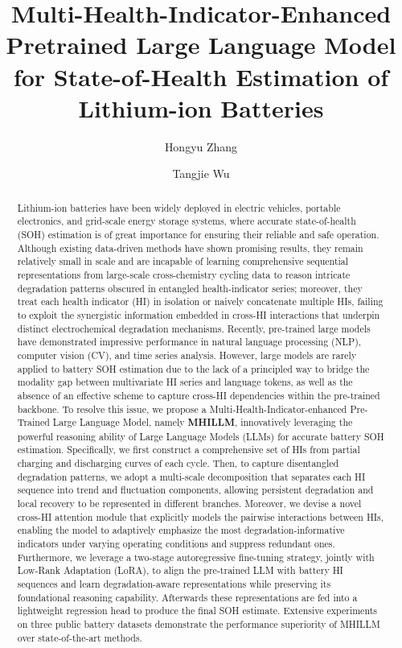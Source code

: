 \documentclass[preprint,12pt]{elsarticle}
\begin{document}
\begin{frontmatter}


\title{Multi-Health-Indicator-Enhanced Pretrained Large Language Model for State-of-Health Estimation of Lithium-ion Batteries}


\author{Hongyu Zhang}
\address[hfut]{Hefei University of Technology, Hefei, 230027, China}
\author{Tangjie Wu}
\address[ustc]{University of Science and Technology of China, Hefei, 230027, China}


\begin{abstract}
Lithium-ion batteries have been widely deployed in electric vehicles, portable electronics, and grid-scale energy storage systems, where accurate state-of-health (SOH) estimation is of great importance for ensuring their reliable and safe operation. Although existing data-driven methods have shown promising results, they remain relatively small in scale and are incapable of learning comprehensive sequential representations from large-scale cross-chemistry cycling data to reason intricate degradation patterns obscured in entangled health-indicator series; moreover, they treat each health indicator (HI) in isolation or naively concatenate multiple HIs, failing to exploit the synergistic information embedded in cross-HI interactions that underpin distinct electrochemical degradation mechanisms. Recently, pre-trained large models have demonstrated impressive performance in natural language processing (NLP), computer vision (CV), and time series analysis. However, large models are rarely
  applied to battery SOH estimation due to the lack of a principled way to bridge the modality gap between multivariate HI series and language tokens, as well as the absence of an effective scheme to capture cross-HI dependencies within the pre-trained backbone. To resolve this issue, we propose a Multi-Health-Indicator-enhanced Pre-Trained Large Language Model, namely \textbf{MHILLM}, innovatively leveraging the powerful reasoning ability of Large Language Models (LLMs) for accurate battery SOH estimation. Specifically, we first construct a comprehensive set of HIs from partial charging and discharging curves of each cycle. Then, to capture disentangled degradation patterns, we adopt a multi-scale decomposition that separates each HI sequence into trend and fluctuation components, allowing persistent degradation and local recovery to be represented in different branches. Moreover, we devise a novel cross-HI attention module that explicitly models the pairwise interactions between HIs, enabling the model to adaptively emphasize the most degradation-informative indicators under varying operating conditions and suppress redundant ones.
Furthermore, we leverage a two-stage autoregressive fine-tuning strategy, jointly with Low-Rank Adaptation (LoRA), to align the pre-trained LLM with battery HI sequences and learn degradation-aware representations while preserving its foundational reasoning capability.  Afterwards these representations are fed into a lightweight regression head to produce the final SOH estimate. Extensive experiments on three public battery datasets demonstrate the performance superiority of MHILLM over state-of-the-art methods.


\end{abstract}
\end{frontmatter}
\end{document}
